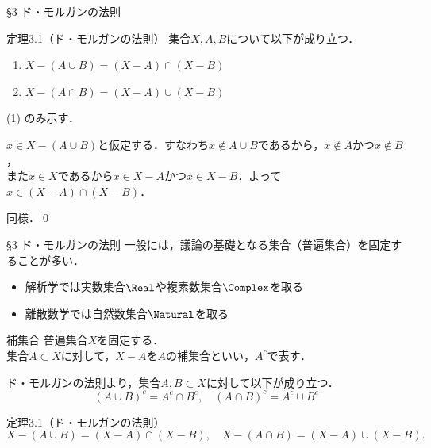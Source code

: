 \documentclass[uplatex,a4paper,dvipdfmx,aspectratio=169,11pt]{beamer}
\begin{document}
\begin{frame}[fragile]{\S 3 ド・モルガンの法則}
    \begin{block}{定理3.1（ド・モルガンの法則）}
        集合$X, A, B$について以下が成り立つ．
        \begin{enumerate}[(1)]
            \item $X - (A \cup B) = (X - A) \cap (X - B)$
            \item $X - (A \cap B) = (X - A) \cup (X - B)$
        \end{enumerate}
    \end{block}
    \smallskip
     (1) のみ示す．\\
    \smallskip
    \begin{description}[($\subset$)]
        \item[($\subset$)] $x \in X - (A \cup B)$と仮定する．すなわち$x \notin A \cup B$であるから，$x \notin A$かつ$x \notin B$，\\
            また$x \in X$であるから$x \in X - A$かつ$x \in X - B$．よって$x \in (X - A) \cap (X - B)$．
        \item[($\supset$)] 同様．\qed
    \end{description}
\end{frame}

\begin{frame}[fragile]{\S 3 ド・モルガンの法則}
    一般には，議論の基礎となる集合（\alert{普遍集合}）を固定することが多い．

    \smallskip
    \begin{itemize}
        \item 解析学では実数集合$\Real$や複素数集合$\Complex$を取る
        \item 離散数学では自然数集合$\Natural$を取る
    \end{itemize}
    \smallskip

    \begin{block}{補集合}
    普遍集合$X$を固定する．\\
    集合$A \subset X$に対して，$X - A$を$A$の\alert{補集合}といい，$A^c$で表す．
    \end{block}
    \smallskip

    ド・モルガンの法則より，集合$A, B \subset X$に対して以下が成り立つ．
    \begin{equation*}
        (A \cup B)^c = A^c \cap B^c, \quad (A \cap B)^c = A^c \cup B^c
    \end{equation*}
    \begin{block}{定理3.1（ド・モルガンの法則）}
        \begin{equation*}
            X - (A \cup B) = (X - A) \cap (X - B), \quad X - (A \cap B) = (X - A) \cup (X - B).
        \end{equation*}
    \end{block}
\end{frame}
\end{document}
